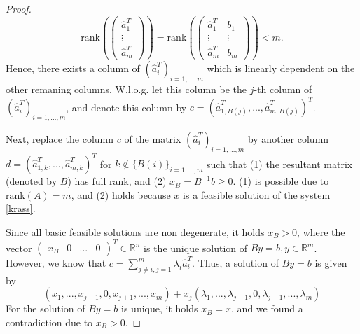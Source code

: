 \documentclass[12pt,letterpaper]{article}
\begin{document}
\begin{proof}
    \[
        \mathrm{rank}(\begin{pmatrix}
            \hat a_1^T \\
            \vdots \\
            \hat a_m^T
        \end{pmatrix}) = \mathrm{rank}(\begin{pmatrix}
            \hat a_1^T & b_1 \\
            \vdots & \vdots \\
            \hat a_m^T & b_m
        \end{pmatrix}) < m.
    \]
    Hence, there exists a column of $(\hat a_i^T)_{i=1,...,m}$ which is linearly dependent on the other remaning columns. W.l.o.g. let this column be the $j$-th column of $(\hat a_i^T)_{i=1,...,m}$, and denote this column by $c = (\hat a^T_{1,B(j)}, ..., \hat a^T_{m,B(j)})^T$. 

    Next, replace the column $c$ of the matrix $(\hat a_i^T)_{i=1,...,m}$ by another column $d = (\hat a^T_{1,k}, ..., \hat a^T_{m,k})^T$ for $k \notin \{B(i)\}_{i=1,...,m}$ such that (1) the resultant matrix (denoted by $B$) has full rank, and (2) $x_B = B^{-1} b \geq 0$. (1)  is possible due to $\mathrm{rank}(A) = m$, and (2) holds because $x$ is a feasible solution of the system \eqref{krass}.

    Since all basic feasible solutions are non degenerate, it holds $x_B > 0$, where the vector $\begin{pmatrix} x_B & 0 & ... & 0\end{pmatrix}^T \in \mathbb R^n$ is the unique solution of $By = b, y \in \mathbb R^m$. However, we know that $c = \sum_{j \neq i, j = 1}^m \lambda_{i} \hat a_i^T$. Thus,
    a solution of $By = b$ is given by 
    \[
        (x_1, ..., x_{j-1}, 0, x_{j+1}, ..., x_m) + x_j (\lambda_1,...,\lambda_{j-1},0,\lambda_{j+1},...,\lambda_m)
    \]
    For the solution of $By = b$ is unique, it holds $x_B = x$, and we found a contradiction due to $x_B > 0$.
\end{proof}
\end{document}
